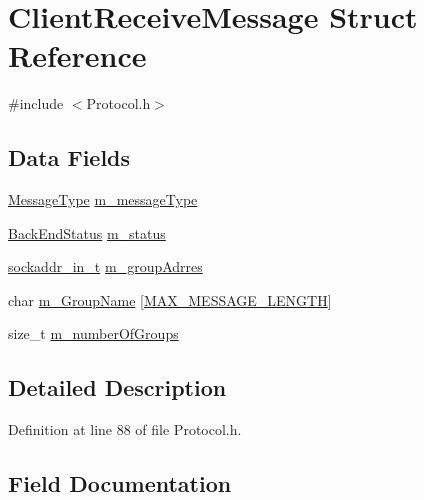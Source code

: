 \hypertarget{structClientReceiveMessage}{}\section{Client\+Receive\+Message Struct Reference}
\label{structClientReceiveMessage}


{\ttfamily \#include $<$Protocol.\+h$>$}

\subsection*{Data Fields}
\begin{DoxyCompactItemize}
\item 
\hyperlink{Protocol_8h_ac6606ebe91c8ac66a2c314c79f5ab013}{Message\+Type} \hyperlink{structClientReceiveMessage_a9e16d9d8c949b34fe62b61907ed2a009}{m\+\_\+message\+Type}
\item 
\hyperlink{Protocol_8h_a4947063aa4bf9e1f8a563cc89f98f716}{Back\+End\+Status} \hyperlink{structClientReceiveMessage_a3f5eb262b68916035c8268e906a4ee32}{m\+\_\+status}
\item 
\hyperlink{groupsHandle_8h_a833d9365af0fc2308a2172dea4a18094}{sockaddr\+\_\+in\+\_\+t} \hyperlink{structClientReceiveMessage_aab3b16d0d269ab80b4511c8aa0e70b2d}{m\+\_\+group\+Adrres}
\item 
char \hyperlink{structClientReceiveMessage_a5515f09efee781b16d62940a8ece5cd7}{m\+\_\+\+Group\+Name} \mbox{[}\hyperlink{Protocol_8h_ab234d1358562b66925fb7223c087556b}{M\+A\+X\+\_\+\+M\+E\+S\+S\+A\+G\+E\+\_\+\+L\+E\+N\+G\+TH}\mbox{]}
\item 
size\+\_\+t \hyperlink{structClientReceiveMessage_ac7c80fba616c9836a1dc043838b0b4ed}{m\+\_\+number\+Of\+Groups}
\end{DoxyCompactItemize}


\subsection{Detailed Description}


Definition at line 88 of file Protocol.\+h.



\subsection{Field Documentation}

